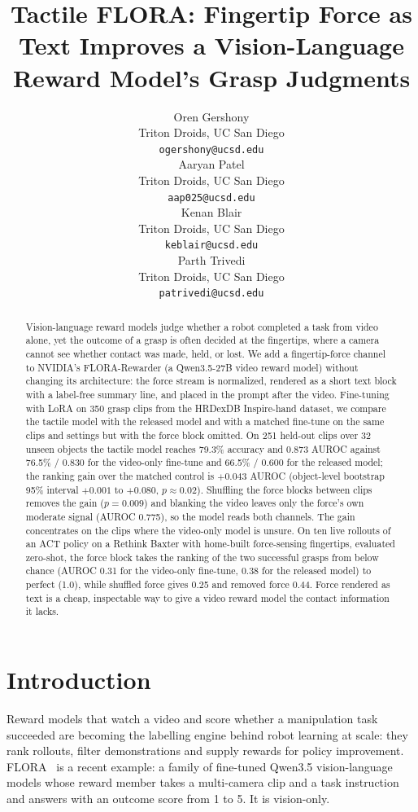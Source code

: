 \documentclass{article}
\title{Tactile FLORA: Fingertip Force as Text Improves a Vision-Language Reward Model's Grasp Judgments}
\author{%
  Oren Gershony \\
  Triton Droids, UC San Diego \\
  \texttt{ogershony@ucsd.edu} \\
  \And
  Aaryan Patel \\
  Triton Droids, UC San Diego \\
  \texttt{aap025@ucsd.edu} \\
  \And
  Kenan Blair \\
  Triton Droids, UC San Diego \\
  \texttt{keblair@ucsd.edu} \\
  \And
  Parth Trivedi \\
  Triton Droids, UC San Diego \\
  \texttt{patrivedi@ucsd.edu} \\
}
\begin{document}
\maketitle

\begin{abstract}
Vision-language reward models judge whether a robot completed a task from video alone, yet the
outcome of a grasp is often decided at the fingertips, where a camera cannot see whether contact
was made, held, or lost. We add a fingertip-force channel to NVIDIA's FLORA-Rewarder (a
Qwen3.5-27B video reward model) without changing its architecture: the force stream is normalized,
rendered as a short text block with a label-free summary line, and placed in the prompt after the
video. Fine-tuning with LoRA on 350 grasp clips from the HRDexDB Inspire-hand dataset, we compare
the tactile model with the released model and with a matched fine-tune on the same clips and
settings but with the force block omitted. On 251 held-out clips over 32 unseen objects the tactile
model reaches 79.3\% accuracy and 0.873 AUROC against 76.5\% / 0.830 for the video-only fine-tune
and 66.5\% / 0.600 for the released model; the ranking gain over the matched control is
$+0.043$ AUROC (object-level bootstrap 95\% interval $+0.001$ to $+0.080$, $p \approx 0.02$).
Shuffling the force blocks between clips removes the gain ($p = 0.009$) and blanking the video
leaves only the force's own moderate signal (AUROC 0.775), so the model reads both channels. The
gain concentrates on the clips where the video-only model is unsure. On ten live rollouts of an
ACT policy on a Rethink Baxter with home-built force-sensing fingertips, evaluated zero-shot, the
force block takes the ranking of the two successful grasps from below chance (AUROC 0.31 for the
video-only fine-tune, 0.38 for the released model) to perfect (1.0), while shuffled force gives
0.25 and removed force 0.44. Force rendered as text is a cheap, inspectable way to give a video
reward model the contact information it lacks.
\end{abstract}

\section{Introduction}

Reward models that watch a video and score whether a manipulation task succeeded are becoming the
labelling engine behind robot learning at scale: they rank rollouts, filter demonstrations and
supply rewards for policy improvement. FLORA~\cite{flora2026} is a recent example: a family of
fine-tuned Qwen3.5 vision-language models whose reward member takes a multi-camera clip and a task
instruction and answers with an outcome score from 1 to 5. It is vision-only.
\end{document}
